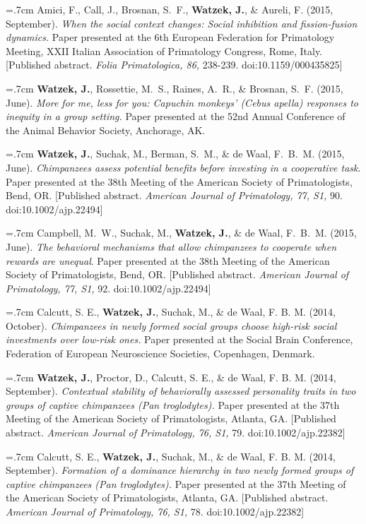 \documentclass[]{friggeri-cv}
\begin{document}
\hangindent=.7cm Amici, F., Call, J., Brosnan, S.~F., \textbf{Watzek, J.}, \& Aureli, F. (2015, September). \emph{When the social context changes: Social inhibition and fission-fusion dynamics.} Paper presented at the 6th European Federation for Primatology Meeting, XXII Italian Association of Primatology Congress, Rome, Italy. [Published abstract. \emph{Folia Primatologica, 86,} 238-239. doi:10.1159/000435825]

\hangindent=.7cm \textbf{Watzek, J.}, Rossettie, M.~S., Raines, A.~R., \& Brosnan, S.~F. (2015, June). \emph{More for me, less for you: Capuchin monkeys' (\emph{Cebus apella}) responses to inequity in a group setting.} Paper presented at the 52nd Annual Conference of the Animal Behavior Society, Anchorage, AK.

\hangindent=.7cm \textbf{Watzek, J.}, Suchak, M., Berman, S.~M., \& de Waal, F.~B.~M. (2015, June). \emph{Chimpanzees assess potential benefits before investing in a cooperative task}. Paper presented at the 38th Meeting of the American Society of Primatologists, Bend, OR. [Published abstract. \emph{American Journal of Primatology, 77, S1,} 90. doi:10.1002/ajp.22494]

\hangindent=.7cm Campbell, M.~W., Suchak, M., \textbf{Watzek, J.}, \& de Waal, F.~B.~M. (2015, June). \emph{The behavioral mechanisms that allow chimpanzees to cooperate when rewards are unequal}. Paper presented at the 38th Meeting of the American Society of Primatologists, Bend, OR. [Published abstract. \emph{American Journal of Primatology, 77, S1,} 92. doi:10.1002/ajp.22494]

\hangindent=.7cm Calcutt, S. E., \textbf{Watzek, J.}, Suchak, M., \& de Waal, F. B. M. (2014, October). \emph{Chimpanzees in newly formed social groups choose high-risk social investments over low-risk ones.} Paper presented at the Social Brain Conference, Federation of European Neuroscience Societies, Copenhagen, Denmark.

\hangindent=.7cm \textbf{Watzek, J.}, Proctor, D., Calcutt, S. E., \& de Waal, F. B. M. (2014, September). \emph{Contextual stability of behaviorally assessed personality traits in two groups of captive chimpanzees (\textit{Pan troglodytes}).} Paper presented at the 37th Meeting of the American Society of Primatologists, Atlanta, GA. [Published abstract. \emph{American Journal of Primatology, 76, S1,} 79. doi:10.1002/ajp.22382]

\hangindent=.7cm Calcutt, S. E., \textbf{Watzek, J.}, Suchak, M., \& de Waal, F. B. M. (2014, September). \emph{Formation of a dominance hierarchy in two newly formed groups of captive chimpanzees (\textit{Pan troglodytes}).} Paper presented at the 37th Meeting of the American Society of Primatologists, Atlanta, GA. [Published abstract. \emph{American Journal of Primatology, 76, S1,} 78. doi:10.1002/ajp.22382]
\end{document}
